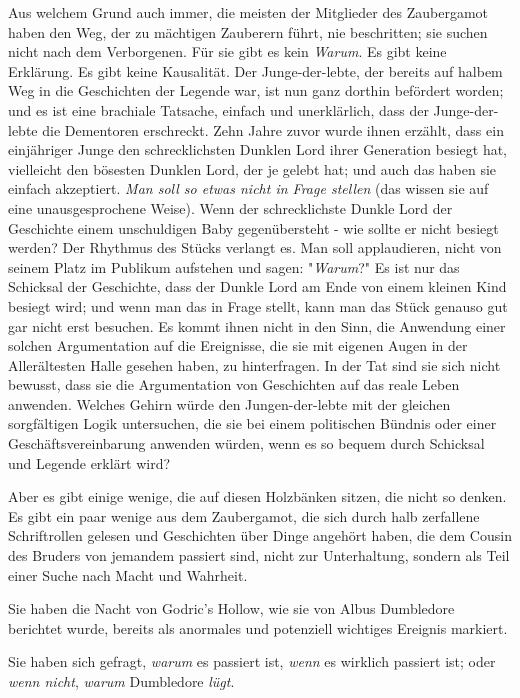 {Aus welchem Grund auch immer, die meisten der Mitglieder des Zaubergamot haben den Weg, der zu mächtigen Zauberern führt, nie beschritten; sie suchen nicht nach dem Verborgenen. Für sie gibt es kein \emph{Warum}. Es gibt keine Erklärung. Es gibt keine Kausalität. Der Junge-der-lebte, der bereits auf halbem Weg in die Geschichten der Legende war, ist nun ganz dorthin befördert worden; und es ist eine brachiale Tatsache, einfach und unerklärlich, dass der Junge-der-lebte die Dementoren erschreckt. Zehn Jahre zuvor wurde ihnen erzählt, dass ein einjähriger Junge den schrecklichsten Dunklen Lord ihrer Generation besiegt hat, vielleicht den bösesten Dunklen Lord, der je gelebt hat; und auch das haben sie einfach akzeptiert. \emph{Man soll so etwas nicht in Frage stellen} (das wissen sie auf eine unausgesprochene Weise). Wenn der schrecklichste Dunkle Lord der Geschichte einem unschuldigen Baby gegenübersteht - wie sollte er nicht besiegt werden? Der Rhythmus des Stücks verlangt es. Man soll applaudieren, nicht von seinem Platz im Publikum aufstehen und sagen: "\emph{Warum}?" Es ist nur das Schicksal der Geschichte, dass der Dunkle Lord am Ende von einem kleinen Kind besiegt wird; und wenn man das in Frage stellt, kann man das Stück genauso gut gar nicht erst besuchen. Es kommt ihnen nicht in den Sinn, die Anwendung einer solchen Argumentation auf die Ereignisse, die sie mit eigenen Augen in der Allerältesten Halle gesehen haben, zu hinterfragen. In der Tat sind sie sich nicht bewusst, dass sie die Argumentation von Geschichten auf das reale Leben anwenden. Welches Gehirn würde den Jungen-der-lebte mit der gleichen sorgfältigen Logik untersuchen, die sie bei einem politischen Bündnis oder einer Geschäftsvereinbarung anwenden würden, wenn es so bequem durch Schicksal und Legende erklärt wird?

Aber es gibt einige wenige, die auf diesen Holzbänken sitzen, die nicht so denken. Es gibt ein paar wenige aus dem Zaubergamot, die sich durch halb zerfallene Schriftrollen gelesen und Geschichten über Dinge angehört haben, die dem Cousin des Bruders von jemandem passiert sind, nicht zur Unterhaltung, sondern als Teil einer Suche nach Macht und Wahrheit.

Sie haben die Nacht von Godric's Hollow, wie sie von Albus Dumbledore berichtet wurde, bereits als anormales und potenziell wichtiges Ereignis markiert.

Sie haben sich gefragt, \emph{warum} es passiert ist, \emph{wenn} es wirklich passiert ist; oder \emph{wenn nicht}, \emph{warum} Dumbledore \emph{lügt}.

}
